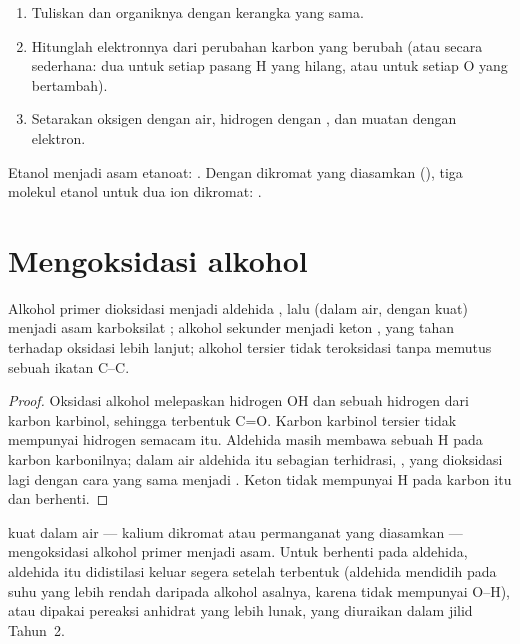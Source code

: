 \begin{method}\label{met:b1:organic-redox:balance-organic-redox}
\begin{enumerate}
  \item Tuliskan  dan  organiknya dengan kerangka yang
        sama.
  \item Hitunglah elektronnya dari perubahan  karbon yang
        berubah (atau secara sederhana: dua untuk setiap pasang H yang
        hilang, atau untuk setiap O yang bertambah).
  \item Setarakan oksigen dengan air, hidrogen dengan , dan muatan
        dengan elektron.
\end{enumerate}
Etanol menjadi asam etanoat: .
Dengan dikromat yang diasamkan (),
tiga molekul etanol untuk dua ion dikromat:
.
\end{method}

\section{Mengoksidasi alkohol}

\begin{proposition}\label{prop:b1:organic-redox:alcohol-oxidation}
Alkohol primer  dioksidasi menjadi aldehida , lalu
(dalam air, dengan  kuat) menjadi asam karboksilat ;
alkohol sekunder  menjadi keton , yang tahan terhadap
oksidasi lebih lanjut; alkohol tersier  tidak teroksidasi tanpa
memutus sebuah ikatan C--C.
\end{proposition}

\begin{proof}
Oksidasi alkohol melepaskan hidrogen OH dan sebuah hidrogen dari karbon
karbinol, sehingga terbentuk C=O. Karbon karbinol tersier tidak mempunyai
hidrogen semacam itu. Aldehida masih membawa sebuah H pada karbon
karbonilnya; dalam air aldehida itu sebagian terhidrasi, ,
yang dioksidasi lagi dengan cara yang sama menjadi . Keton tidak
mempunyai H pada karbon itu dan berhenti.
\end{proof}

 kuat dalam air --- kalium dikromat atau permanganat yang
diasamkan --- mengoksidasi alkohol primer menjadi asam. Untuk berhenti
pada aldehida, aldehida itu didistilasi keluar segera setelah terbentuk
(aldehida mendidih pada suhu yang lebih rendah daripada alkohol asalnya,
karena tidak mempunyai  O--H), atau dipakai pereaksi
anhidrat yang lebih lunak, yang diuraikan dalam jilid Tahun~2.

